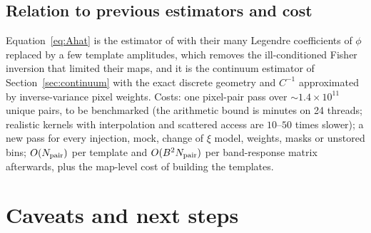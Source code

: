 \documentclass[11pt,a4paper]{article}
\begin{document}
\subsection{Relation to previous estimators and cost}
Equation~\eqref{eq:Ahat} is the estimator of \citet{2005.04109} with their many Legendre coefficients of $\phi$ replaced by a few template amplitudes, which removes the ill-conditioned Fisher inversion that limited their maps, and it is the continuum estimator of Section~\ref{sec:continuum} with the exact discrete geometry and $C^{-1}$ approximated by inverse-variance pixel weights. Costs: one pixel-pair pass over $\sim1.4\times10^{11}$ unique pairs, to be benchmarked (the arithmetic bound is minutes on 24 threads; realistic kernels with interpolation and scattered access are $10$--$50$ times slower); a new pass for every injection, mock, change of $\xi$ model, weights, masks or unstored bins; $O(N_{\rm pair})$ per template and $O(B^2N_{\rm pair})$ per band-response matrix afterwards, plus the map-level cost of building the templates.

\section{Caveats and next steps}
\end{document}
